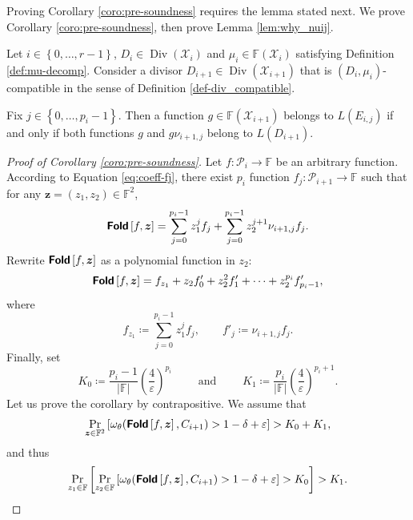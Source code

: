 \documentclass[10pt,a4paper]{article}
\renewcommand\epsilon{\varepsilon}
\newcommand\F{\mathbb{F}}
\newcommand\fold[1]{\textsf{\textbf{Fold}}\left[#1\right]}
\DeclareMathOperator{\Div}{Div}
\renewcommand{\vec}[1]{\boldsymbol{#1}}
\newcommand{\set}[1]{\left\{#1\right\}}
\newcommand{\size}[1]{\left|#1\right|}
\newcommand{\range}[1]{\set{0,\dots,#1-1}}
\newcommand\bfz{{\vec{z}}}
\newcommand\calX{\mathcal{X}}
\newcommand\calP{\mathcal{P}}
\newcommand\mydef{\coloneqq}
\theoremstyle{plain}
\theoremstyle{plain}
\theoremstyle{definition}
\theoremstyle{remark}
\theoremstyle{plain}
\begin{document}
Proving Corollary \ref{coro:pre-soundness} requires the lemma stated next. We prove Corollary \ref{coro:pre-soundness}, then prove Lemma \ref{lem:why_nuij}.

\begin{lemma}\label{lem:why_nuij}
	Let $i \in \range{r}$, $D_i \in \Div(\calX_i)$ and $\mu_i \in \F(\calX_i)$ satisfying Definition \eqref{def:mu-decomp}. Consider a divisor $D_{i+1}\in\Div(\calX_{i+1})$ that is $(D_i,\mu_i)$-compatible in the sense of Definition \ref{def-div_compatible}.
	
	Fix $j \in \range{p_i}$. Then a function $g\in \F(\calX_{i+1})$ belongs to $L(E_{i,j})$ if and only if both functions $g$ and $g \nu_{i+1,j}$ belong to $L(D_{i+1})$.
\end{lemma}

\begin{proof}[Proof of Corollary \ref{coro:pre-soundness}]
	Let $f : \calP_i \rightarrow \F$ be an arbitrary function. According to Equation \eqref{eq:coeff-fj}, there exist $p_i$ function $f_j : \calP_{i+1} \rightarrow \F$ such that for any $\bfz=(z_1,z_2) \in \F^2$,
	\[\fold{f, \bfz} = \sum_{j = 0}^{p_i - 1}z_1^j f_j + \sum_{j = 0}^{p_i - 1}z_2^{j+1} \nu_{i+1,j} f_j.\]
	Rewrite $\fold{f, \bfz}$ as a polynomial function in $z_2$: \[\fold{f, \bfz}=f_{z_1} + z_2 f'_0+  z_2^2 f'_1 + \dots + z_2^{p_i} f'_{p_i-1},\] where \[f_{z_1} \mydef \sum_{j = 0}^{p_i - 1}z_1^j f_j, \qquad f'_j\mydef \nu_{i+1,j} f_j.\] Finally, set
	\[
	K_0 \mydef \frac{p_i - 1}{\size \F}\left(\frac{4}{\epsilon}\right)^{p_i} \qquad \text{ and } \qquad K_1 \mydef \frac{p_i}{\size \F}\left(\frac{4}{\epsilon}\right)^{p_i + 1} .
	\]    
	Let us prove the corollary by contrapositive. We assume that
	\[
	\Pr_{\bfz \in \F^2}\left[\omega_\theta(\fold{f, \bfz}, C_{i+1}) > 1 - \delta + \epsilon\right] > K_0 + K_1,
	\]
	and thus \[\Pr_{z_1 \in \F}\left[\Pr_{z_2 \in \F} \left[\omega_\theta(\fold{f, \bfz}, C_{i+1}) > 1 - \delta + \epsilon\right] > K_0\right] > K_1.\]
	

\end{proof}
\end{document}
